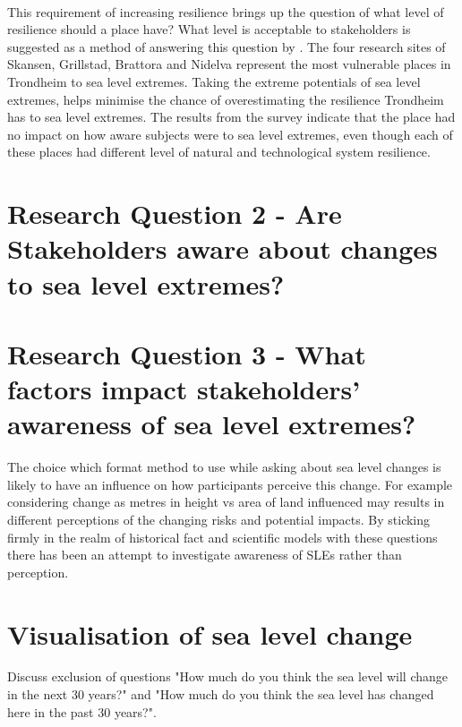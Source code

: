 \paragraph{}
This requirement of increasing resilience brings up the question of what level of resilience should a place have? What level is acceptable to stakeholders is suggested as a method of answering this question by \cite{gerkensmeier_governing_2018}. The four research sites of Skansen, Grillstad, Brattora and Nidelva represent the most vulnerable places in Trondheim to sea level extremes. Taking the extreme potentials of sea level extremes, helps minimise the chance of overestimating the resilience Trondheim has to sea level extremes. The results from the survey indicate that the place had no impact on how aware subjects were to sea level extremes, even though each of these places had different level of natural and technological system resilience. 




\section{Research Question 2 - Are Stakeholders aware about changes to sea level extremes?}


\section{Research Question 3 - What factors impact stakeholders' awareness of sea level extremes? }


The choice which format method to use while asking about sea level changes is likely to have an influence on how participants perceive this change. For example considering change as metres in height vs area of land influenced may results in different perceptions of the changing risks and potential impacts.  By sticking firmly in the realm of historical fact and scientific models with these questions there has been an attempt to investigate awareness of SLEs rather than perception. 

\section{Visualisation of sea level change}
Discuss exclusion of questions "How much do you think the sea level will change in the next 30 years?" and "How much do you think the sea level has changed here in the past 30 years?". 

